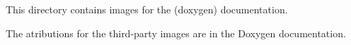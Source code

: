 This directory contains images for the (doxygen) documentation.

The atributions for the third-\/party images are in the Doxygen documentation. 